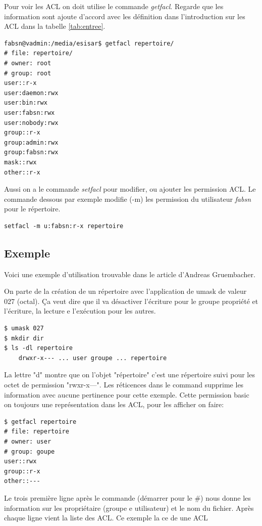 Pour voir les ACL on doit utilise le commande \emph{getfacl}. Regarde que les information sont ajoute d'accord avec les définition dans l'introduction sur les ACL dans la tabelle \ref{tab:entree}. 

\begin{verbatim}
fabsn@vadmin:/media/esisar$ getfacl repertoire/
# file: repertoire/
# owner: root
# group: root
user::r-x
user:daemon:rwx
user:bin:rwx
user:fabsn:rwx
user:nobody:rwx
group::r-x
group:admin:rwx
group:fabsn:rwx
mask::rwx
other::r-x	
\end{verbatim}

Aussi on a le commande \emph{setfacl} pour modifier, ou ajouter les permission ACL. Le commande dessous par exemple modifie (-m) les permission du utilisateur \emph{fabsn} pour le répertoire. 

\begin{verbatim}
setfacl -m u:fabsn:r-x repertoire
\end{verbatim}

\subsection*{Exemple}

Voici une exemple d'utilisation trouvable dans le article d'Andreas Gruembacher\cite{aclsuse}.

On parte de la création de un répertoire avec l'application de umask de valeur 027 (octal). Ça veut dire que il va   désactiver l'écriture pour le groupe propriété et l'écriture, la lecture e l'exécution pour les autres.

\begin{verbatim}
$ umask 027 
$ mkdir dir 
$ ls -dl repertoire
	drwxr-x--- ... user groupe ... repertoire
\end{verbatim}

La lettre "d" montre que on l'objet "répertoire" c'est une répertoire suivi pour les octet de permission "rwxr-x---". Les réticences dans le command supprime les information avec aucune pertinence pour cette exemple. Cette permission basic on toujours une représentation dans les ACL, pour les afficher on faire:

\begin{verbatim}
$ getfacl repertoire
# file: repertoire 
# owner: user 
# group: goupe 
user::rwx
group::r-x
other::---
\end{verbatim}

Le trois première ligne après le commande (démarrer pour le \#) nous donne les information sur les propriétaire (groupe e utilisateur) et le nom du fichier. Après chaque ligne vient la liste des ACL. Ce exemple la ce de une ACL 

